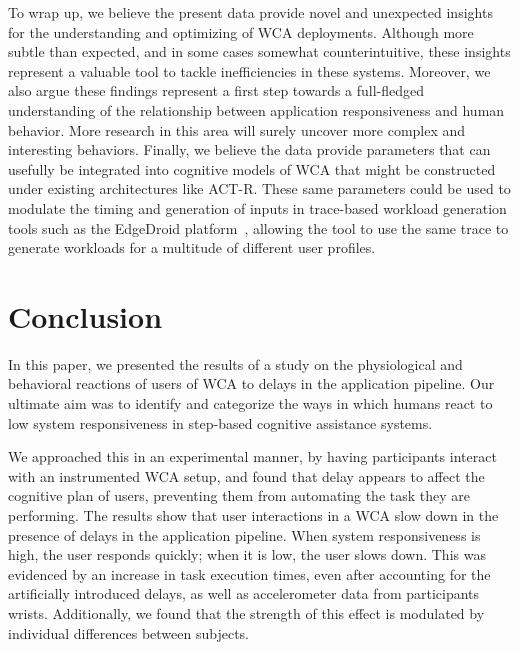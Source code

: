 \documentclass[10pt,letterpaper]{article}
\begin{document}
To wrap up, we believe the present data provide novel and unexpected insights for the understanding and optimizing of WCA deployments.
Although more subtle than expected, and in some cases somewhat counterintuitive, these insights represent a valuable tool to tackle inefficiencies in these systems.
Moreover, we also argue these findings represent a first step towards a full-fledged understanding of the relationship between application responsiveness and human behavior.
More research in this area will surely uncover more complex and interesting behaviors.
Finally, we believe the data provide parameters that can usefully be integrated into cognitive models of WCA that might be constructed under existing architectures like ACT-R.
These same parameters could be used to modulate the timing and generation of inputs in trace-based workload generation tools such as the EdgeDroid platform~\autocite{olguin:2018,olguin:2019}, allowing the tool to use the same trace to generate workloads for a multitude of different user profiles.

\section{Conclusion}\label{sec:conclusion}

In this paper, we presented the results of a study on the physiological and behavioral reactions of users of WCA to delays in the application pipeline.
Our ultimate aim was to identify and categorize the ways in which humans react to low system responsiveness in step-based cognitive assistance systems.

We approached this in an experimental manner, by having participants interact with an instrumented WCA setup, and found that delay appears to affect the cognitive plan of users, preventing them from automating the task they are performing.
The results show that user interactions in a WCA slow down in the presence of delays in the application pipeline.
When system responsiveness is high, the user responds quickly; when it is low, the user slows down.
This was evidenced by an increase in task execution times, even after accounting for the artificially introduced delays, as well as accelerometer data from participants wrists.
Additionally, we found that the strength of this effect is modulated by individual differences between subjects.
\end{document}
